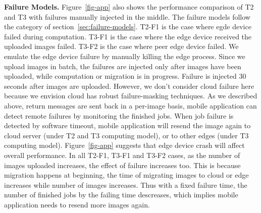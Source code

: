 \hfill\break
\noindent \textbf{Failure Models.}
Figure~\ref{fig-app} also shows the performance comparison of T2 and T3 with failures manually injected in the middle.
The failure models follow the category of section~\ref{sec:failure-models}. T2-F1 is the case where egde device failed
during computation. T3-F1 is the case where the edge device received the uploaded images failed. T3-F2 is the case where
peer edge device failed. We emulate the edge device failure by manually killing the edge process.
Since we upload images in batch, the failures are injected only after images have been uploaded, while computation or migration is in progress.
Failure is injected 30 seconds after images are uploaded.
However, we don't consider cloud failure here because we envision cloud has robust failure-masking techniques.
As we described above, return messages are sent back in a per-image basis, mobile application can detect remote failures by monitoring the finished jobs.
When job failure is detected by software timeout, mobile application will resend the image again to cloud server (under T2 and T3 computing model),
or to other edges (under T3 computing model).
Figure~\ref{fig-app} suggests that edge device crash will affect overall performance. In all T2-F1, T3-F1 and T3-F2 cases, as the number of images uploaded increases,
the effect of failure increases too. This is because migration happens at beginning, the time of migrating images to cloud or edge increases while number of images increases.
Thus with a fixed failure time, the number of finished jobs by the failing time descreases, which implies mobile application needs to resend more images again.


